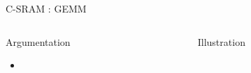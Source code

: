 \begin{Frame}{C-SRAM : GEMM}
 \begin{columns}[t]
   \begin{column}{\BW}
      \begin{block}{Argumentation}
          \begin{itemize}
        \item
      \end{itemize}

    \end{block}

  \end{column}
  \begin{column}{\BW}
      \begin{block}{Illustration}
    \end{block}

  \end{column}

 \end{columns}

\end{Frame}

